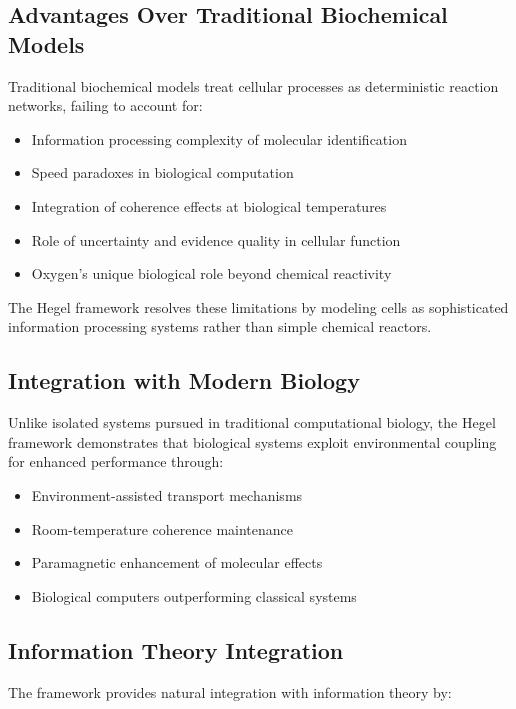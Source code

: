 \documentclass[12pt,a4paper]{article}
\begin{document}
\subsection{Advantages Over Traditional Biochemical Models}

Traditional biochemical models treat cellular processes as deterministic reaction networks, failing to account for:

\begin{itemize}
\item Information processing complexity of molecular identification
\item Speed paradoxes in biological computation
\item Integration of coherence effects at biological temperatures
\item Role of uncertainty and evidence quality in cellular function
\item Oxygen's unique biological role beyond chemical reactivity
\end{itemize}

The Hegel framework resolves these limitations by modeling cells as sophisticated information processing systems rather than simple chemical reactors.

\subsection{Integration with Modern Biology}

Unlike isolated systems pursued in traditional computational biology, the Hegel framework demonstrates that biological systems exploit environmental coupling for enhanced performance through:

\begin{itemize}
\item Environment-assisted transport mechanisms
\item Room-temperature coherence maintenance
\item Paramagnetic enhancement of molecular effects
\item Biological computers outperforming classical systems
\end{itemize}

\subsection{Information Theory Integration}

The framework provides natural integration with information theory by:
\end{document}
